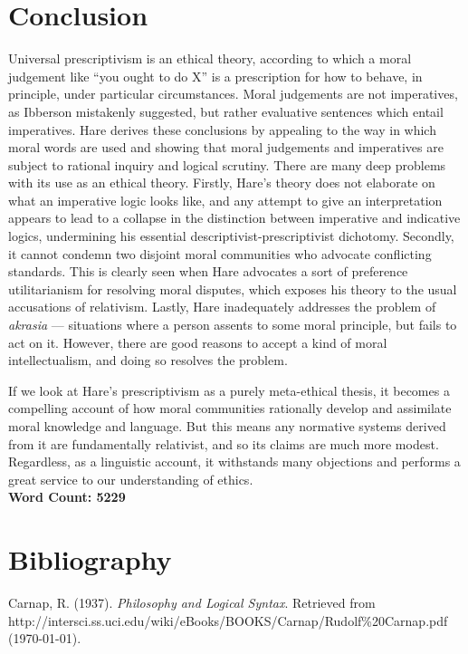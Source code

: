 \documentclass[12pt]{article}
\begin{document}
\section{Conclusion}

Universal prescriptivism is an ethical theory, according to which a moral judgement like ``you ought to do X'' is a prescription for how to behave, in principle, under particular circumstances. Moral judgements are not imperatives, as Ibberson mistakenly suggested, but rather evaluative sentences which entail imperatives. Hare derives these conclusions by appealing to the way in which moral words are used and showing that moral judgements and imperatives are subject to rational inquiry and logical scrutiny. There are many deep problems with its use as an ethical theory. Firstly, Hare's theory does not elaborate on what an imperative logic looks like, and any attempt to give an interpretation appears to lead to a collapse in the distinction between imperative and indicative logics, undermining his essential descriptivist-prescriptivist dichotomy. Secondly, it cannot condemn two disjoint moral communities who advocate conflicting standards. This is clearly seen when Hare advocates a sort of preference utilitarianism for resolving moral disputes, which exposes his theory to the usual accusations of relativism. Lastly, Hare inadequately addresses the problem of \textit{akrasia} --- situations where a person assents to some moral principle, but fails to act on it. However, there are good reasons to accept a kind of moral intellectualism, and doing so resolves the problem.

If we look at Hare's prescriptivism as a purely meta-ethical thesis, it becomes a compelling account of how moral communities rationally develop and assimilate moral knowledge and language. But this means any normative systems derived from it are fundamentally relativist, and so its claims are much more modest. Regardless, as a linguistic account, it withstands many objections and performs a great service to our understanding of ethics.\\

\noindent
\textbf{Word Count: 5229}


\section*{Bibliography}

\noindent
Carnap, R. (1937). \textit{Philosophy and Logical Syntax}. Retrieved from\\ http://intersci.ss.uci.edu/wiki/eBooks/BOOKS/Carnap/Rudolf\%20Carnap.pdf\\ (\today).\\ 
\end{document}
